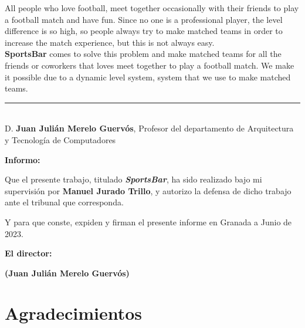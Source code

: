 All people who love football, meet together occasionally with their friends to play a football match and have fun.
Since no one is a professional player, the level difference is so high, so people always try to make matched teams in order to increase the match experience,
 but this is not always easy.\\

\textbf{SportsBar} comes to solve this problem and make matched teams for all the friends or coworkers that loves meet together to play a football match.
We make it possible due to a dynamic level system, system that we use to make matched teams.





\cleardoublepage

\thispagestyle{empty}

\noindent\rule[-1ex]{\textwidth}{2pt}\\[4.5ex]

D. \textbf{Juan Julián Merelo Guervós}, Profesor del departamento de Arquitectura y Tecnología de Computadores

\vspace{0.5cm}

\textbf{Informo:}

\vspace{0.5cm}

Que el presente trabajo, titulado \textit{\textbf{SportsBar}},
ha sido realizado bajo mi supervisión por \textbf{Manuel Jurado Trillo}, y autorizo la defensa de dicho trabajo ante el tribunal
que corresponda.

\vspace{0.5cm}

Y para que conste, expiden y firman el presente informe en Granada a Junio de 2023.

\vspace{1cm}

\textbf{El director: }

\vspace{5cm}

\noindent \textbf{(Juan Julián Merelo Guervós)}

\chapter*{Agradecimientos}




